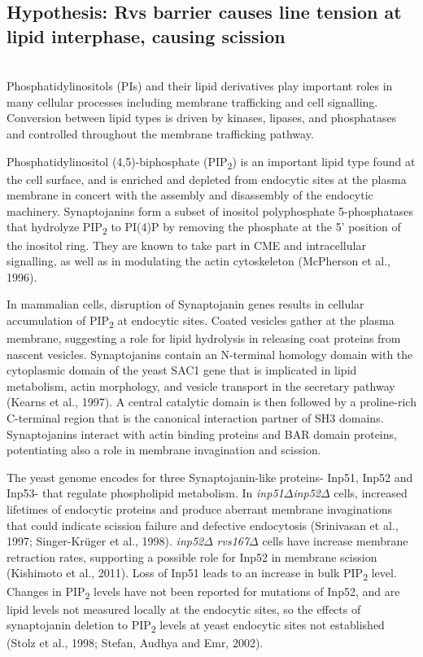 \newpage
\subsection{Hypothesis: Rvs barrier causes line tension at lipid interphase, causing scission}
			\mbox{}\\
Phosphatidylinositols (PIs) and their lipid derivatives play important roles in many cellular processes including membrane trafficking and cell signalling. Conversion between lipid types is driven by kinases, lipases, and phosphatases and controlled throughout the membrane trafficking pathway. 


\vspace{5mm}
Phosphatidylinositol (4,5)-biphosphate (PIP\textsubscript{2}) is an important lipid type found at the cell surface, and is enriched and depleted from endocytic sites at the plasma membrane in concert with the assembly and disassembly of the endocytic machinery. Synaptojanins form a subset of inositol polyphosphate 5-phosphatases that hydrolyze PIP\textsubscript{2} to PI(4)P by removing the phosphate at the 5’ position of the inositol ring. They are known to take part in CME and intracellular signalling, as well as in modulating the actin cytoskeleton (McPherson et al., 1996). 


\vspace{5mm}
In mammalian cells, disruption of Synaptojanin genes results in cellular accumulation of PIP\textsubscript{2} at endocytic sites. Coated vesicles gather at the plasma membrane, suggesting a role for lipid hydrolysis in releasing coat proteins from nascent vesicles. Synaptojanins contain an N-terminal homology domain with the cytoplasmic domain of the yeast SAC1 gene that is implicated in lipid metabolism, actin morphology, and vesicle transport in the secretary pathway (Kearns et al., 1997). A central catalytic domain is then followed by a proline-rich C-terminal region that is the canonical interaction partner of SH3 domains. Synaptojanins interact with actin binding proteins and BAR domain proteins, potentiating also a role in membrane invagination and scission. 


\vspace{5mm}
The yeast genome encodes for three Synaptojanin-like proteins- Inp51, Inp52 and Inp53- that regulate phospholipid metabolism. In \textit{inp51$\Delta$}\textit{inp52$\Delta$}
 cells, increased lifetimes of endocytic proteins and produce aberrant membrane invaginations that could indicate scission failure and defective endocytosis (Srinivasan et al., 1997; Singer-Krüger et al., 1998). \textit{inp52$\Delta$} \textit{rvs167$\Delta$}
 cells have increase membrane retraction rates, supporting a possible role for Inp52 in membrane scission (Kishimoto et al., 2011). Loss of Inp51 leads to an increase in bulk PIP\textsubscript{2} level. Changes in PIP\textsubscript{2} levels have not been reported for mutations of Inp52, and are lipid levels not measured locally at the endocytic sites, so the effects of synaptojanin deletion to PIP\textsubscript{2} levels at yeast endocytic sites not established (Stolz et al., 1998; Stefan, Audhya and Emr, 2002).



